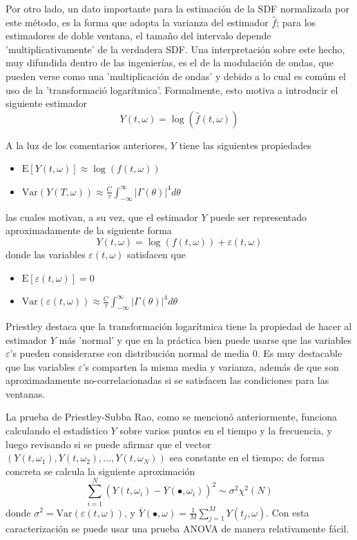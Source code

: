 \documentclass[12pt,a4paper]{mitthesis}
\newcommand{\intR}{\int_{-\infty}^{\infty}}
\newcommand{\est}[1]{\widehat{ #1 }}
\newcommand{\E}[1]{\mathrm{E}\left[ #1 \right]}
\newcommand{\Var}[1]{\mathrm{Var}\left( #1 \right)}
\newcommand{\abso}[1]{\left| #1 \right|}
\begin{document}
Por otro lado, un dato importante para la estimaci\'on de la SDF normalizada por este m\'etodo, es 
la forma que adopta la varianza del estimador $\widehat{f}$; para los estimadores de doble ventana, 
el tama\~no del intervalo depende 'multiplicativamente' de la verdadera SDF.
Una interpretaci\'on sobre este hecho, muy difundida dentro de las ingenier\'ias, es el de la 
modulaci\'on de ondas, que pueden verse como una 'multiplicaci\'on de ondas' y debido a lo cual es 
com\'um el uso de la 'transformaci\'o logar\'itmica'.
Formalmente, esto motiva a introducir el siguiente estimador
\begin{equation*}
Y(t,\omega) = \log{\left( \est{f}(t,\omega)\right)}
\end{equation*}

A la luz de los comentarios anteriores, $Y$ tiene las siguientes propiedades
\begin{itemize}
\item $\displaystyle 
\E{ Y(t,\omega) } \approx \log \left( f(t,\omega) \right)$
\item $\displaystyle 
\Var{ Y(T,\omega) } 
\approx \frac{C}{\tau} \intR \abso{\Gamma (\theta)}^{4} d\theta $
\end{itemize}
las cuales motivan, a su vez, que el estimador $Y$ puede ser representado aproximadamente de la
siguiente forma
\begin{equation*}
Y(t,\omega) = \log \left( f(t,\omega) \right) + \varepsilon(t,\omega)
\end{equation*}
donde las variables $\varepsilon(t,\omega)$ satisfacen que
\begin{itemize}
\item $\displaystyle \E{\varepsilon(t,\omega)} = 0$
\item $\displaystyle \Var{\varepsilon(t,\omega)}
\approx \frac{C}{\tau} \intR \abso{\Gamma (\theta)}^{4} d\theta$
\end{itemize}

Priestley \cite{Priestley81} destaca que la transformaci\'on logar\'itmica tiene la propiedad de 
hacer al estimador $Y$ m\'as 'normal' y que en la pr\'actica bien puede usarse que las variables 
$\varepsilon$'s pueden considerarse con distribuci\'on normal de media 0.
Es muy destacable que las variables $\varepsilon$'s comparten la misma media y varianza, adem\'as 
de que son aproximadamente 
no-correlacionadas si se satisfacen las condiciones para las ventanas.

La prueba de Priestley-Subba Rao, como se mencion\'o anteriormente, funciona calculando el 
estad\'istico $Y$ sobre varios puntos en el tiempo y la frecuencia, y luego revisando si se puede
afirmar que el vector  $\left( Y(t,\omega_1), Y(t,\omega_2), \dots, Y(t,\omega_N) \right)$ sea 
constante en el tiempo; de forma concreta  se calcula la siguiente aproximaci\'on
\begin{equation*}
\sum_{i = 1 }^{N} \left( Y(t,\omega_i) - \overline{Y}(\bullet,\omega_i) \right)^{2} 
\sim \sigma^{2} \chi^{2}(N)
\end{equation*}
donde $\sigma^{2} = \Var{\varepsilon(t,\omega)}$, y
$\overline{Y}(\bullet,\omega) = \frac{1}{M} \sum_{j=1}^{M} Y(t_j,\omega)$.
Con esta caracterizaci\'on se puede usar una prueba ANOVA de manera relativamente f\'acil.
\end{document}
